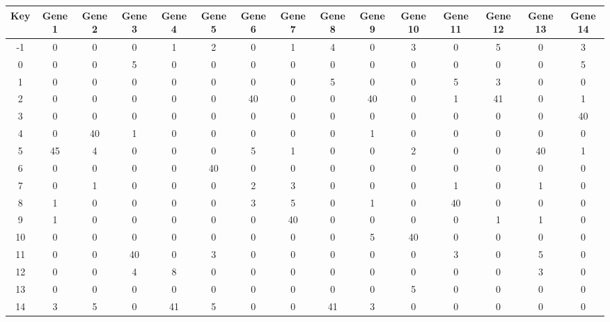 \begin{tabular}{|c|c|c|c|c|c|c|c|c|c|c|c|c|c|c|}
\hline
Key & Gene 1 & Gene 2 & Gene 3 & Gene 4 & Gene 5 & Gene 6 & Gene 7 & Gene 8 & Gene 9 & Gene 10 & Gene 11 & Gene 12 & Gene 13 & Gene 14 \\
\hline
-1 & 0 & 0 & 0 & 1 & 2 & 0 & 1 & 4 & 0 & 3 & 0 & 5 & 0 & 3 \\
0 & 0 & 0 & 5 & 0 & 0 & 0 & 0 & 0 & 0 & 0 & 0 & 0 & 0 & 5 \\
1 & 0 & 0 & 0 & 0 & 0 & 0 & 0 & 5 & 0 & 0 & 5 & 3 & 0 & 0 \\
2 & 0 & 0 & 0 & 0 & 0 & 40 & 0 & 0 & 40 & 0 & 1 & 41 & 0 & 1 \\
3 & 0 & 0 & 0 & 0 & 0 & 0 & 0 & 0 & 0 & 0 & 0 & 0 & 0 & 40 \\
4 & 0 & 40 & 1 & 0 & 0 & 0 & 0 & 0 & 1 & 0 & 0 & 0 & 0 & 0 \\
5 & 45 & 4 & 0 & 0 & 0 & 5 & 1 & 0 & 0 & 2 & 0 & 0 & 40 & 1 \\
6 & 0 & 0 & 0 & 0 & 40 & 0 & 0 & 0 & 0 & 0 & 0 & 0 & 0 & 0 \\
7 & 0 & 1 & 0 & 0 & 0 & 2 & 3 & 0 & 0 & 0 & 1 & 0 & 1 & 0 \\
8 & 1 & 0 & 0 & 0 & 0 & 3 & 5 & 0 & 1 & 0 & 40 & 0 & 0 & 0 \\
9 & 1 & 0 & 0 & 0 & 0 & 0 & 40 & 0 & 0 & 0 & 0 & 1 & 1 & 0 \\
10 & 0 & 0 & 0 & 0 & 0 & 0 & 0 & 0 & 5 & 40 & 0 & 0 & 0 & 0 \\
11 & 0 & 0 & 40 & 0 & 3 & 0 & 0 & 0 & 0 & 0 & 3 & 0 & 5 & 0 \\
12 & 0 & 0 & 4 & 8 & 0 & 0 & 0 & 0 & 0 & 0 & 0 & 0 & 3 & 0 \\
13 & 0 & 0 & 0 & 0 & 0 & 0 & 0 & 0 & 0 & 5 & 0 & 0 & 0 & 0 \\
14 & 3 & 5 & 0 & 41 & 5 & 0 & 0 & 41 & 3 & 0 & 0 & 0 & 0 & 0 \\
\hline
\end{tabular}